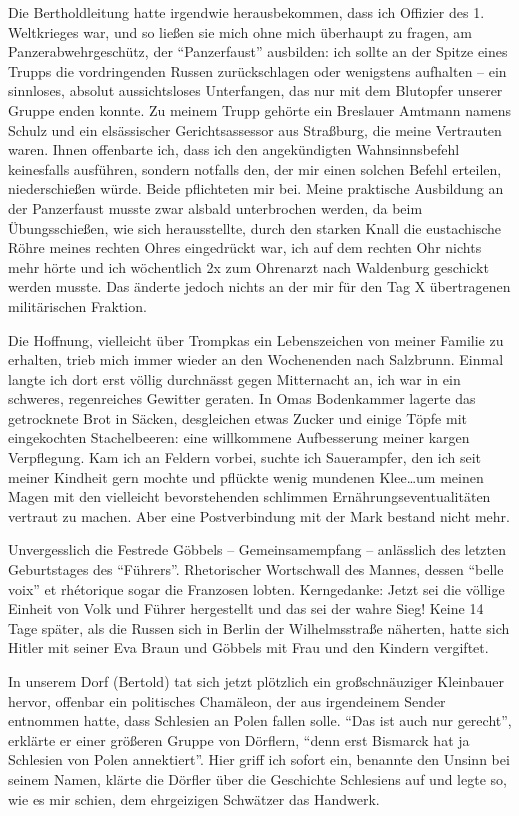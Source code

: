 \documentclass[a5paper,pagesize,10pt,twoside=true]{scrbook}
\renewcommand{\marginpar}[2][]{}
\begin{document}
Die Bertholdleitung hatte irgendwie herausbekommen, dass ich Offizier des 1. Weltkrieges war, und so ließen sie mich ohne mich überhaupt zu fragen, am Panzerabwehrgeschütz, der \enquote{Panzerfaust} ausbilden: ich sollte an der Spitze eines Trupps die vordringenden Russen zurückschlagen oder wenigstens aufhalten -- ein sinnloses, absolut aussichtsloses Unterfangen, das nur mit dem Blutopfer unserer Gruppe enden konnte. Zu meinem Trupp gehörte ein Breslauer Amtmann namens Schulz und ein \marginpar{66} elsässischer Gerichtsassessor aus Straßburg, die meine Vertrauten waren. Ihnen offenbarte ich, dass ich den angekündigten Wahnsinnsbefehl keinesfalls ausführen, sondern notfalls den, der mir einen solchen Befehl erteilen, niederschießen würde. Beide pflichteten mir bei. Meine praktische Ausbildung an der Panzerfaust musste zwar alsbald unterbrochen werden, da beim Übungsschießen, wie sich herausstellte, durch den starken Knall die eustachische Röhre meines rechten Ohres eingedrückt war, ich auf dem rechten Ohr nichts mehr hörte und ich wöchentlich 2x zum Ohrenarzt nach Waldenburg geschickt werden musste. Das änderte jedoch nichts an der mir für den Tag X übertragenen militärischen Fraktion.

Die Hoffnung, vielleicht über Trompkas ein Lebenszeichen von meiner Familie zu erhalten, trieb mich immer wieder an den Wochenenden nach Salzbrunn. Einmal langte ich dort erst völlig durchnässt gegen Mitternacht an, ich war in ein schweres, regenreiches Gewitter geraten. In Omas Bodenkammer lagerte das getrocknete Brot in Säcken, desgleichen etwas Zucker und einige Töpfe mit eingekochten Stachelbeeren: eine willkommene Aufbesserung meiner kargen Verpflegung. Kam ich an Feldern vorbei, \marginpar{67} suchte ich Sauerampfer, den ich seit meiner Kindheit gern mochte und pflückte wenig mundenen Klee\dots um meinen Magen mit den vielleicht bevorstehenden schlimmen Ernährungseventualitäten vertraut zu machen. Aber eine Postverbindung mit der Mark bestand nicht mehr.

Unvergesslich die Festrede Göbbels -- Gemeinsamempfang -- anlässlich des letzten Geburtstages des \enquote{Führers}. Rhetorischer Wortschwall des Mannes, dessen \enquote{belle voix} et rhétorique sogar die Franzosen lobten. Kerngedanke: Jetzt sei die völlige Einheit von Volk und Führer hergestellt und das sei der wahre Sieg! Keine 14 Tage später, als die Russen sich in Berlin der Wilhelmsstraße näherten, hatte sich Hitler mit seiner Eva Braun und Göbbels mit Frau und den Kindern vergiftet.

In unserem Dorf (Bertold) tat sich jetzt plötzlich ein großschnäuziger Kleinbauer hervor, offenbar ein politisches Chamäleon, der aus irgendeinem Sender entnommen hatte, dass Schlesien an Polen fallen solle. \enquote{Das ist auch nur gerecht}, erklärte er einer größeren Gruppe von Dörflern, \enquote{denn erst Bismarck hat ja Schlesien von Polen annektiert}. Hier griff ich sofort ein, benannte den Unsinn bei seinem Namen, klärte die Dörfler über die Geschichte Schlesiens auf und legte so, wie es mir schien, dem ehrgeizigen Schwätzer das Handwerk.
\end{document}
